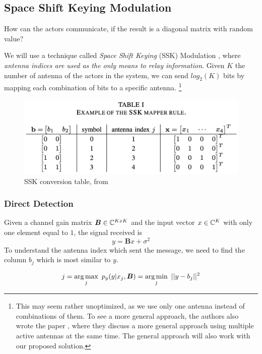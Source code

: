 \subsection{Space Shift Keying Modulation
}

How can the actors communicate, if the result is a diagonal matrix with random value?

We will use a technique called \textit{Space Shift Keying} (SSK) Modulation \cite{5165332}, where \textit{antenna indices are used as the only means to relay information}. Given $K$ the number of antenna of the actors in the system, we can send $log_2(K)$ bits by mapping each combination of bits to a specific antenna.
\footnote{This may seem rather unoptimized, as we use only one antenna instead of combinations of them. To see a more general approach, the authors also wrote the paper \cite{4699782}, where they discuss a more general approach using multiple active antennas at the same time. The general approach will also work with our proposed solution.}

\begin{figure}[H]
  \centering
  \includegraphics[width=\linewidth]{imgs/ssk_conversion_table.png}
  \caption{SSK conversion table, from \cite{5165332}}
  \label{fig:ssk_conversion_table}
\end{figure}

\subsubsection{Direct Detection}
Given a channel gain matrix $\bm{B} \in \mathbb{C}^{KxK}$ and the input vector $x \in \mathbb{C}^K$ with only one element equal to $1$, the signal received is
\begin{equation}
  y = \bm{B}x + \sigma^2
\end{equation}
To understand the antenna index which sent the message, we need to find the column $b_j$ which is most similar to $y$.

\begin{equation}
  j = \operatorname*{arg\,max}_j\ p_y (y | x_j, \bm{B}) = \operatorname*{arg\,min}_j\ || y - b_j ||^2
  \label{eq:direct_detection}
\end{equation}

